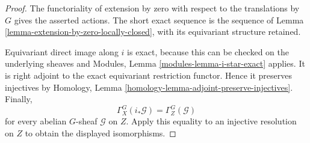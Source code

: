 \begin{proof}
The functoriality of extension by zero with respect to the translations by
$G$ gives the asserted actions. The short exact sequence is the sequence of
Lemma \ref{lemma-extension-by-zero-locally-closed}, with its equivariant
structure retained.

Equivariant direct image along $i$ is exact, because this can be checked on
the underlying sheaves and Modules, Lemma
\ref{modules-lemma-i-star-exact} applies. It is right adjoint to the exact
equivariant restriction functor. Hence it preserves injectives by Homology,
Lemma \ref{homology-lemma-adjoint-preserve-injectives}. Finally,
$$
\Gamma_X^G(i_*\mathcal{G})=\Gamma_Z^G(\mathcal{G})
$$
for every abelian $G$-sheaf $\mathcal{G}$ on $Z$. Apply this equality to an
injective resolution on $Z$ to obtain the displayed isomorphisms.
\end{proof}

